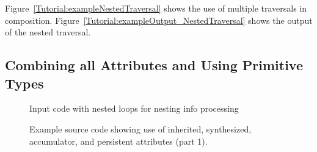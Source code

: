      Figure~\ref{Tutorial:exampleNestedTraversal} shows the use of multiple 
traversals in composition. Figure~\ref{Tutorial:exampleOutput_NestedTraversal}
shows the output of the nested traversal.





\clearpage
\subsection{Combining all Attributes and Using Primitive Types}

\begin{figure}[!h]
{\indent
{\mySmallFontSize


\begin{latexonly}
   
\end{latexonly}

\begin{htmlonly}
   
\end{htmlonly}
}
}
\caption{Input code with nested loops for nesting info processing}
\label{Tutorial:exampleInputCode_ExampleLoopNestingInfoProcessing}
\end{figure}

\begin{figure}[!h]
{\indent
{\mySmallFontSize

\begin{latexonly}
   
\end{latexonly}

\begin{htmlonly}
   
\end{htmlonly}

}
}
\caption{Example source code showing use of inherited, synthesized, accumulator, and persistent attributes (part 1).}
\label{Tutorial:exampleLoopNestingInfoProcessing}
\end{figure}



